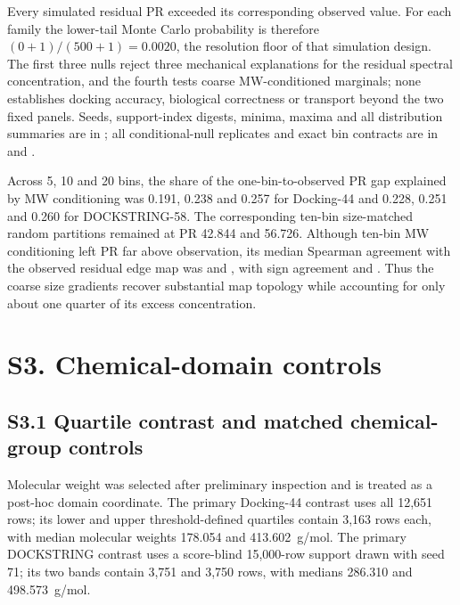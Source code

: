 \documentclass[11pt]{article}
\begin{document}
Every simulated residual PR exceeded its corresponding observed value. For
each family the lower-tail Monte Carlo probability is therefore
$(0+1)/(500+1)=0.0020$, the resolution floor of that simulation design. The
first three nulls reject three mechanical explanations for the residual
spectral concentration, and the fourth tests coarse MW-conditioned marginals;
none establishes docking accuracy, biological
correctness or transport beyond the two fixed panels. Seeds, support-index
digests, minima, maxima and all distribution summaries are in
; all conditional-null
replicates and exact bin contracts are in
 and
.

Across 5, 10 and 20 bins, the share of the one-bin-to-observed PR gap explained
by MW conditioning was 0.191, 0.238 and 0.257 for Docking-44 and 0.228, 0.251
and 0.260 for DOCKSTRING-58. The corresponding ten-bin size-matched random
partitions remained at PR 42.844 and 56.726. Although ten-bin MW conditioning
left PR far above observation, its median Spearman agreement with the observed
residual edge map was \DffMWConditionedMapRho{} and
\DsMWConditionedMapRho{}, with sign agreement
\DffMWConditionedSignAgreement{} and \DsMWConditionedSignAgreement{}. Thus the
coarse size gradients recover substantial map topology while accounting for
only about one quarter of its excess concentration.

\section*{S3. Chemical-domain controls}

\subsection*{S3.1 Quartile contrast and matched chemical-group controls}

Molecular weight was selected after preliminary inspection and is treated as a
post-hoc domain coordinate. The primary Docking-44 contrast uses all 12,651
rows; its lower and upper threshold-defined quartiles contain 3,163 rows each,
with median molecular weights 178.054 and 413.602~g/mol. The primary
DOCKSTRING contrast uses a score-blind 15,000-row support drawn with seed 71;
its two bands contain 3,751 and 3,750 rows, with medians 286.310 and
498.573~g/mol.
\end{document}
